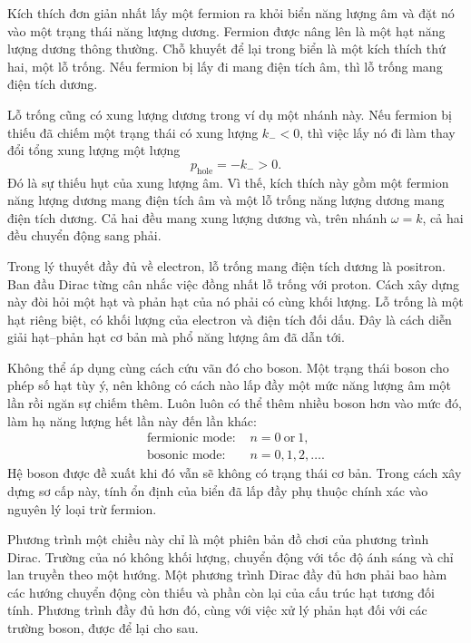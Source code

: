 Kích thích đơn giản nhất lấy một fermion ra khỏi biển năng lượng âm và đặt nó vào một trạng thái năng lượng dương. Fermion được nâng lên là một hạt năng lượng dương thông thường. Chỗ khuyết để lại trong biển là một kích thích thứ hai, một lỗ trống. Nếu fermion bị lấy đi mang điện tích âm, thì lỗ trống mang điện tích dương.

Lỗ trống cũng có xung lượng dương trong ví dụ một nhánh này. Nếu fermion bị thiếu đã chiếm một trạng thái có xung lượng \(k_-<0\), thì việc lấy nó đi làm thay đổi tổng xung lượng một lượng
\begin{equation}
p_{\mathrm{hole}}=-k_->0.
\end{equation}
Đó là sự thiếu hụt của xung lượng âm. Vì thế, kích thích này gồm một fermion năng lượng dương mang điện tích âm và một lỗ trống năng lượng dương mang điện tích dương. Cả hai đều mang xung lượng dương và, trên nhánh \(\omega=k\), cả hai đều chuyển động sang phải.

Trong lý thuyết đầy đủ về electron, lỗ trống mang điện tích dương là positron. Ban đầu Dirac từng cân nhắc việc đồng nhất lỗ trống với proton. Cách xây dựng này đòi hỏi một hạt và phản hạt của nó phải có cùng khối lượng. Lỗ trống là một hạt riêng biệt, có khối lượng của electron và điện tích đối dấu. Đây là cách diễn giải hạt--phản hạt cơ bản mà phổ năng lượng âm đã dẫn tới.

Không thể áp dụng cùng cách cứu vãn đó cho boson. Một trạng thái boson cho phép số hạt tùy ý, nên không có cách nào lấp đầy một mức năng lượng âm một lần rồi ngăn sự chiếm thêm. Luôn luôn có thể thêm nhiều boson hơn vào mức đó, làm hạ năng lượng hết lần này đến lần khác:
\begin{equation}
\begin{aligned}
\text{fermionic mode: }&n=0\ \text{or}\ 1,\\
\text{bosonic mode: }&n=0,1,2,\ldots .
\end{aligned}
\end{equation}
Hệ boson được đề xuất khi đó vẫn sẽ không có trạng thái cơ bản. Trong cách xây dựng sơ cấp này, tính ổn định của biển đã lấp đầy phụ thuộc chính xác vào nguyên lý loại trừ fermion.

Phương trình một chiều này chỉ là một phiên bản đồ chơi của phương trình Dirac. Trường của nó không khối lượng, chuyển động với tốc độ ánh sáng và chỉ lan truyền theo một hướng. Một phương trình Dirac đầy đủ hơn phải bao hàm các hướng chuyển động còn thiếu và phần còn lại của cấu trúc hạt tương đối tính. Phương trình đầy đủ hơn đó, cùng với việc xử lý phản hạt đối với các trường boson, được để lại cho sau.